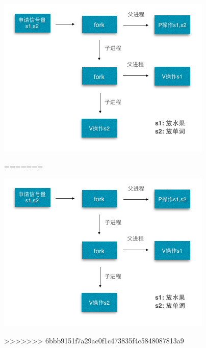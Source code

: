 \documentclass[a4paper]{article}
\begin{document}
{  \begin{center} \includegraphics[scale=0.5]{Illustrations/flow1.png} \end{center}
=======
  \begin{center} \includegraphics[scale=0.5]{Illustrations/flow.png} \end{center}
>>>>>>> 6bbb9151f7a29ac0f1c473835f4c5848087813a9
}
\end{document}
